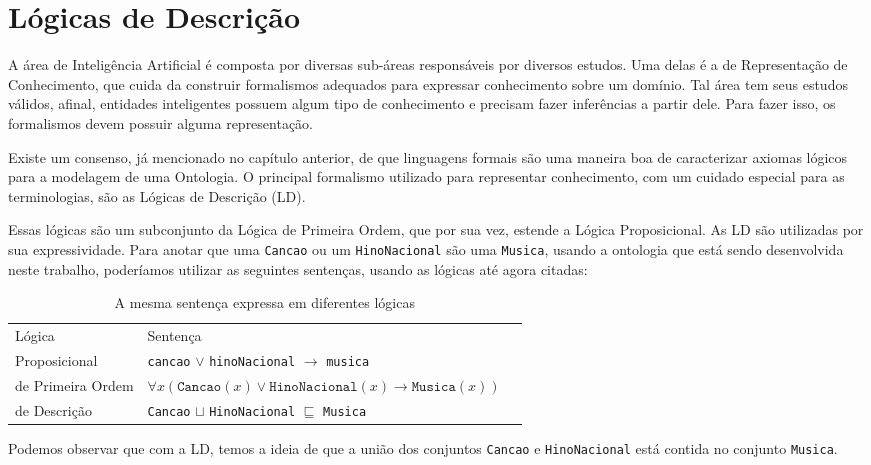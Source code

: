 \chapter{Lógicas de Descrição}

\lettrine{A}{} área de Inteligência Artificial é composta por diversas sub-áreas responsáveis por diversos estudos. Uma delas é a de Representação de Conhecimento, que cuida da construir formalismos adequados para expressar conhecimento sobre um domínio. Tal área tem seus estudos válidos, afinal, entidades inteligentes possuem algum tipo de conhecimento e precisam fazer inferências a partir dele. Para fazer isso, os formalismos devem possuir alguma representação.

Existe um consenso, já mencionado no capítulo anterior, de que linguagens formais são uma maneira boa de caracterizar axiomas lógicos para a modelagem de uma Ontologia. O principal formalismo utilizado para representar conhecimento, com um cuidado especial para as terminologias, são as Lógicas de Descrição (LD).

Essas lógicas são um subconjunto da Lógica de Primeira Ordem, que por sua vez, estende a Lógica Proposicional. As LD são utilizadas por sua expressividade. Para anotar que uma \texttt{Cancao} ou um \texttt{HinoNacional} são uma \texttt{Musica}, usando a ontologia que está sendo desenvolvida neste trabalho, poderíamos utilizar as seguintes sentenças, usando as lógicas até agora citadas:

\begin{table}[H]
	\centering
	\begin{tabular}{|l|l|l}
		\cline{1-2}
		Lógica                   & Sentença & \\ \cline{1-2}
		Proposicional     & \texttt{cancao} $\lor$ \texttt{hinoNacional} $\to$ \texttt{musica} & \\ \cline{1-2}
		de Primeira Ordem & $\forall x(\texttt{Cancao}(x) \lor \texttt{HinoNacional}(x) \to \texttt{Musica}(x))$         & \\ \cline{1-2}
		de Descrição      & \texttt{Cancao} $\sqcup$ \texttt{HinoNacional} $\sqsubseteq$ \texttt{Musica}  & \\ \cline{1-2}
	\end{tabular}
\caption{A mesma sentença expressa em diferentes lógicas}
\end{table}

Podemos observar que com a LD, temos a ideia de que a união dos conjuntos \texttt{Cancao} e \texttt{HinoNacional} está contida no conjunto \texttt{Musica}.

